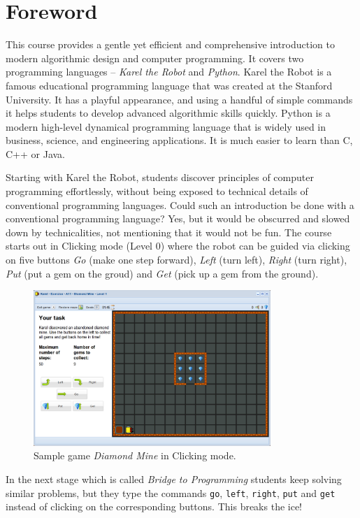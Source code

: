 \documentclass[article,A4,12pt]{llncs}
\begin{document}
\newpage
\setcounter{tocdepth}{2}
\tableofcontents

\newpage

\pagestyle{plain}
\setcounter{page}{1}

\pagestyle{plain}
\setcounter{page}{1}
\section*{Foreword}
This course provides a gentle yet efficient and comprehensive introduction to modern algorithmic 
design and computer programming. It covers two programming languages -- {\em Karel the Robot} 
and {\em Python}. Karel the Robot is a famous 
educational programming language that was created at the Stanford University. It has a playful 
appearance, and using a handful of simple commands it helps students to develop advanced algorithmic 
skills quickly. Python is a modern high-level dynamical programming language that is widely 
used in business, science, and engineering applications. It is much easier to learn than C, C++ or 
Java.

Starting with Karel the Robot, students discover principles of computer programming effortlessly,
without being exposed to technical details of conventional programming languages.
Could such an introduction be done with a conventional programming language? Yes, but 
it would be obscurred and slowed down by technicalities, not mentioning that it would 
not be fun. The course starts out in Clicking mode (Level 0) where the robot can be guided via 
clicking on five buttons {\em Go} (make one step forward), {\em Left} (turn left), {\em Right} 
(turn right), {\em Put} (put a gem on the groud) and {\em Get} (pick up a gem from the ground). 

\begin{figure}[!ht]
\begin{center}
\includegraphics[width=0.8\textwidth]{imgk/fore-1.png}
\end{center}
\vspace{-2mm}
\caption{Sample game {\em Diamond Mine} in Clicking mode.}
\label{fig:f1}
\vspace{-4mm}
\end{figure}
\noindent
In the next stage which is called {\em Bridge to Programming} students keep solving 
similar problems, but they type the commands 
{\tt go}, {\tt left}, {\tt right}, {\tt put} and {\tt get} instead of clicking on the 
corresponding buttons. This breaks the ice!
\end{document}
